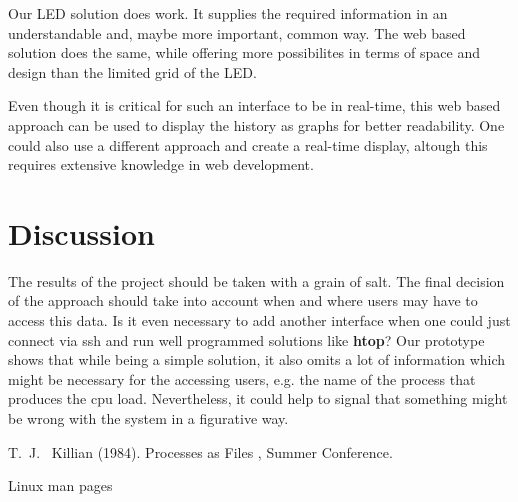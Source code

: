 \documentclass[twoside,twocolumn]{article}
\begin{document}
Our LED solution does work. It supplies the required information in an
understandable and, maybe more important, common way. The web based solution
does the same, while offering more possibilites in terms of space and design 
than the limited grid of the LED. 

Even though it is critical for such an interface to be in real-time, this web 
based approach can be used to display the history as graphs for better 
readability. One could also use a different approach and create a real-time 
display, altough this requires extensive knowledge in web development. 


\section{Discussion}

The results of the project should be taken with a grain of salt. The final
decision of the approach should take into account when and where users may have
to access this data. Is it even necessary to add another interface when one
could just connect via ssh and run well programmed solutions like \textbf{htop}?
Our prototype shows that while being a simple solution, it also omits a lot of
information which might be necessary for the accessing users, e.g. the name of
the process that produces the cpu load. Nevertheless, it could help to signal
that something might be wrong with the system in a figurative way. 


\begin{thebibliography}{99} %

T.~J.~ Killian (1984).
\newblock Processes as Files
, Summer Conference.

Linux man pages

\end{thebibliography}

\end{document}
